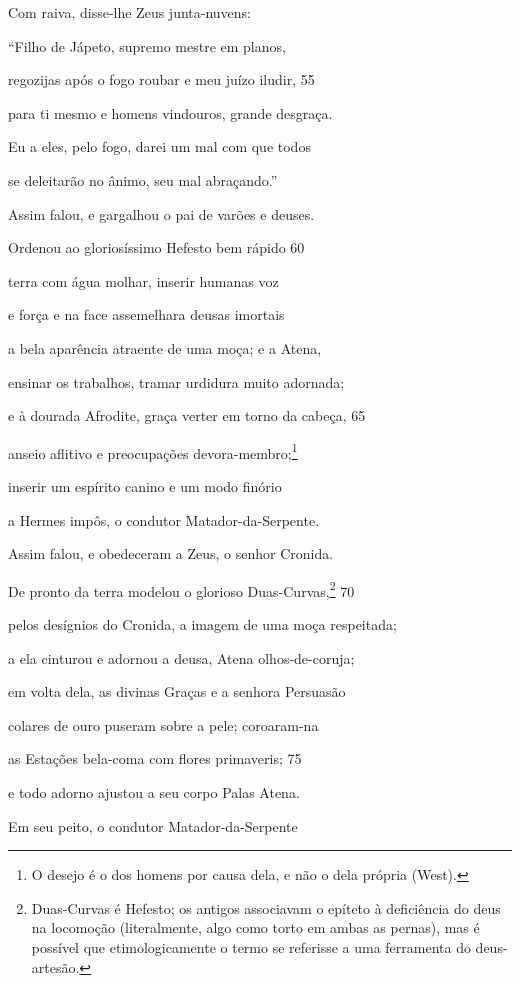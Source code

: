 Com raiva, disse-lhe Zeus junta-nuvens:

``Filho de Jápeto, supremo mestre em planos,

regozijas após o fogo roubar e meu juízo iludir, \num{55}

para ti mesmo e homens vindouros, grande desgraça.

Eu a eles, pelo fogo, darei um mal com que todos

se deleitarão no ânimo, seu mal abraçando.''

Assim falou, e gargalhou o pai de varões e deuses.

Ordenou ao gloriosíssimo Hefesto bem rápido \num{60}

terra com água molhar, inserir humanas voz

e força e na face assemelhara deusas imortais

a bela aparência atraente de uma moça; e a Atena,

ensinar os trabalhos, tramar urdidura muito adornada;

e à dourada Afrodite, graça verter em torno da cabeça, \num{65}

anseio aflitivo e preocupações devora-membro;\footnote{O desejo é o dos homens por causa dela, e não o dela própria (West).}

inserir um espírito canino e um modo finório

a Hermes impôs, o condutor Matador-da-Serpente.

Assim falou, e obedeceram a Zeus, o senhor Cronida.

De pronto da terra modelou o glorioso Duas-Curvas,\footnote{Duas-Curvas é Hefesto; os antigos associavam o epíteto à deficiência
do deus na locomoção (literalmente, algo como torto em ambas as pernas),
mas é possível que etimologicamente o termo se referisse a uma
ferramenta do deus-artesão.} \num{70}

pelos desígnios do Cronida, a imagem de uma moça \qb{}respeitada;

a ela cinturou e adornou a deusa, Atena olhos-de-coruja;

em volta dela, as divinas Graças e a senhora Persuasão

colares de ouro puseram sobre a pele; coroaram-na

as Estações bela-coma com flores primaveris; \num{75}

e todo adorno ajustou a seu corpo Palas Atena.

Em seu peito, o condutor Matador-da-Serpente

